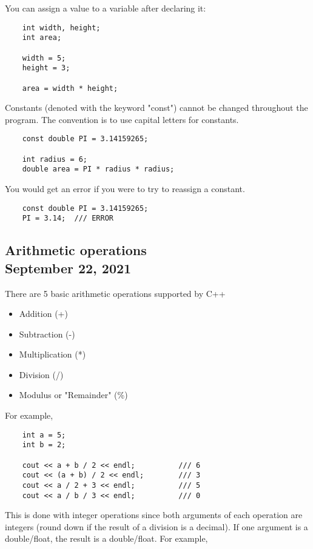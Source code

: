 \documentclass[]{article}
\begin{document}
You can assign a value to a variable after declaring it:
\begin{lstlisting}	
	int width, height;
	int area;
	
	width = 5;
	height = 3;
	
	area = width * height;
\end{lstlisting}
\bigbreak

Constants (denoted with the keyword "const") cannot be changed throughout the program. The convention is to use capital letters for constants.
\begin{lstlisting}	
	const double PI = 3.14159265;

	int radius = 6;
	double area = PI * radius * radius;
\end{lstlisting}
\bigbreak

You would get an error if you were to try to reassign a constant.
\begin{lstlisting}
	const double PI = 3.14159265;
	PI = 3.14; 	/// ERROR
\end{lstlisting}
\bigbreak

\subsection{Arithmetic operations\\ {\large \normalfont September 22, 2021}}
\bigbreak

There are 5 basic arithmetic operations supported by C++
\begin{itemize}
	\item Addition (+)
	\item Subtraction (-)
	\item Multiplication (*)
	\item Division (/)
	\item Modulus or "Remainder" (\%)
\end{itemize}
\bigbreak

For example,

\begin{lstlisting}
	int a = 5;
	int b = 2;
	
	cout << a + b / 2 << endl;			/// 6
	cout << (a + b) / 2 << endl;		/// 3
	cout << a / 2 + 3 << endl;			/// 5
	cout << a / b / 3 << endl;			/// 0
\end{lstlisting}
\bigbreak

This is done with integer operations since both arguments of each operation are integers (round down if the result of a division is a decimal). If one argument is a double/float, the result is a double/float. For example,
\end{document}
